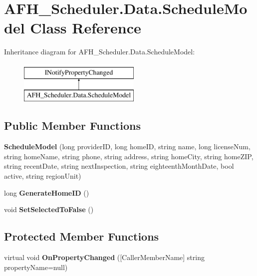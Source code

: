 \section{A\+F\+H\+\_\+\+Scheduler.\+Data.\+Schedule\+Model Class Reference}
\label{class_a_f_h___scheduler_1_1_data_1_1_schedule_model}
Inheritance diagram for A\+F\+H\+\_\+\+Scheduler.\+Data.\+Schedule\+Model\+:\begin{figure}[H]
\begin{center}
\leavevmode
\includegraphics[height=2.000000cm]{class_a_f_h___scheduler_1_1_data_1_1_schedule_model}
\end{center}
\end{figure}
\subsection*{Public Member Functions}
\begin{DoxyCompactItemize}
\item 
\mbox{\label{class_a_f_h___scheduler_1_1_data_1_1_schedule_model_a66efeb285a739d36a5dc64dc55aeb1dd}} 
{\bfseries Schedule\+Model} (long provider\+ID, long home\+ID, string name, long license\+Num, string home\+Name, string phone, string address, string home\+City, string home\+Z\+IP, string recent\+Date, string next\+Inspection, string eighteenth\+Month\+Date, bool active, string region\+Unit)
\item 
\mbox{\label{class_a_f_h___scheduler_1_1_data_1_1_schedule_model_a880790e8f3e5a5ba564ea3d5d14bad4b}} 
long {\bfseries Generate\+Home\+ID} ()
\item 
\mbox{\label{class_a_f_h___scheduler_1_1_data_1_1_schedule_model_a2c93dd91a86ea52344e65be580d6d5e4}} 
void {\bfseries Set\+Selected\+To\+False} ()
\end{DoxyCompactItemize}
\subsection*{Protected Member Functions}
\begin{DoxyCompactItemize}
\item 
\mbox{\label{class_a_f_h___scheduler_1_1_data_1_1_schedule_model_ae5e62ce76f6a3ea450399762fd9af563}} 
virtual void {\bfseries On\+Property\+Changed} ([Caller\+Member\+Name] string property\+Name=null)
\end{DoxyCompactItemize}
